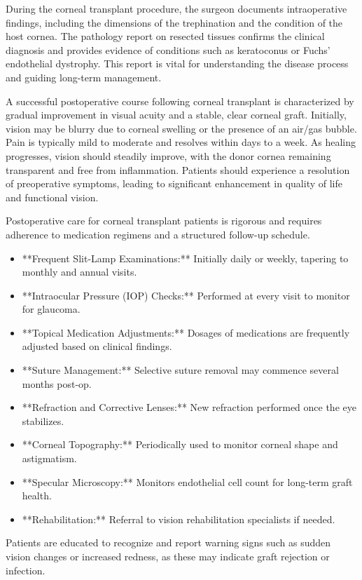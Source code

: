 During the corneal transplant procedure, the surgeon documents intraoperative findings, including the dimensions of the trephination and the condition of the host cornea. The pathology report on resected tissues confirms the clinical diagnosis and provides evidence of conditions such as keratoconus or Fuchs' endothelial dystrophy. This report is vital for understanding the disease process and guiding long-term management.

A successful postoperative course following corneal transplant is characterized by gradual improvement in visual acuity and a stable, clear corneal graft. Initially, vision may be blurry due to corneal swelling or the presence of an air/gas bubble. Pain is typically mild to moderate and resolves within days to a week. As healing progresses, vision should steadily improve, with the donor cornea remaining transparent and free from inflammation. Patients should experience a resolution of preoperative symptoms, leading to significant enhancement in quality of life and functional vision.

Postoperative care for corneal transplant patients is rigorous and requires adherence to medication regimens and a structured follow-up schedule.

\begin{itemize}
  \item **Frequent Slit-Lamp Examinations:** Initially daily or weekly, tapering to monthly and annual visits.
  \item **Intraocular Pressure (IOP) Checks:** Performed at every visit to monitor for glaucoma.
  \item **Topical Medication Adjustments:** Dosages of medications are frequently adjusted based on clinical findings.
  \item **Suture Management:** Selective suture removal may commence several months post-op.
  \item **Refraction and Corrective Lenses:** New refraction performed once the eye stabilizes.
  \item **Corneal Topography:** Periodically used to monitor corneal shape and astigmatism.
  \item **Specular Microscopy:** Monitors endothelial cell count for long-term graft health.
  \item **Rehabilitation:** Referral to vision rehabilitation specialists if needed.
\end{itemize}

Patients are educated to recognize and report warning signs such as sudden vision changes or increased redness, as these may indicate graft rejection or infection.

